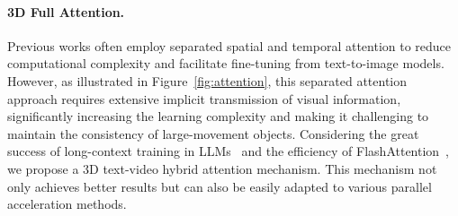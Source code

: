 \paragraph{3D Full Attention.}
Previous works \citep{singer2022make, guo2023animatediff} often employ separated spatial and temporal attention to reduce computational complexity and facilitate fine-tuning from text-to-image models. 
However, as illustrated in Figure~\ref{fig:attention}, this separated attention approach requires extensive implicit transmission of visual information, significantly increasing the learning complexity and making it challenging to maintain the consistency of large-movement objects. 
Considering the great success of long-context training in LLMs~\citep{llama3modelcard, bai2024longalign, xiong2023effective}  and the efficiency of FlashAttention~\citep{dao2022flashattention},  we propose a 3D text-video hybrid attention mechanism. 
This mechanism not only achieves better results but can also be easily adapted to various parallel acceleration methods. 





